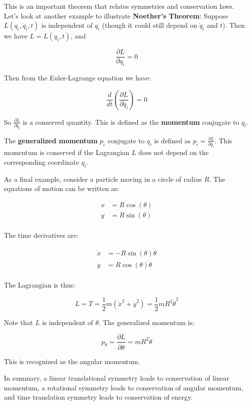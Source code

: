 This is an important theorem that relates symmetries and conservation laws.
Let's look at another example to illustrate \textbf{Noether's Theorem}: Suppose 
$L(q_i, \dot{q}_i, t)$ is independent of $q_i$ (though it could still depend on 
$\dot{q}_i$ and $t$). Then we have $L = L(\dot{q}_i, t)$, and

\begin{equation}
    \frac{\partial L}{\partial q_i} = 0
\end{equation}

Then from the Euler-Lagrange equation we have:

\begin{equation}
    \frac{d}{dt} \left(\frac{\partial L}{\partial \dot{q_i}}\right) = 0
\end{equation}

So $\frac{\partial L}{\partial \dot{q_i}}$ is a conserved quantity. This is defined as 
the \textbf{momentum} conjugate to $q_i$.

\begin{definition}
    The \textbf{generalized momentum} $p_i$ conjugate to $q_i$ is defined as $p_i = \frac{\partial L}{\partial \dot{q_i}}$.
    This momentum is conserved if the Lagrangian $L$ does not depend on the corresponding coordinate $q_i$.
\end{definition}

As a final example, consider a particle moving in a circle of radius $R$. The equations 
of motion can be written as:

\begin{align}
    x&=R\cos(\theta)\\
    y&=R\sin(\theta)\\
\end{align}

The time derivatives are:

\begin{align}
    \dot{x}&=-R\sin(\theta)\dot{\theta}\\
    \dot{y}&=R\cos(\theta)\dot{\theta}\\
\end{align}

The Lagrangian is thus:

\begin{equation}
    L = T = \frac{1}{2} m (\dot{x}^2+\dot{y}^2) = \frac{1}{2} m R^2 \dot{\theta}^2
\end{equation}

Note that $L$ is independent of $\theta$. The generalized momentum is:

\begin{equation}
    p_\theta =  \frac{\partial L}{\partial\dot{\theta}} = m R^2 \dot{\theta}
\end{equation}

This is recognized as the angular momentum.

In summary, a linear translational symmetry leads to conservation of linear momentum, a 
rotational symmetry leads to conservation of angular momentum, and time translation 
symmetry leads to conservation of energy.